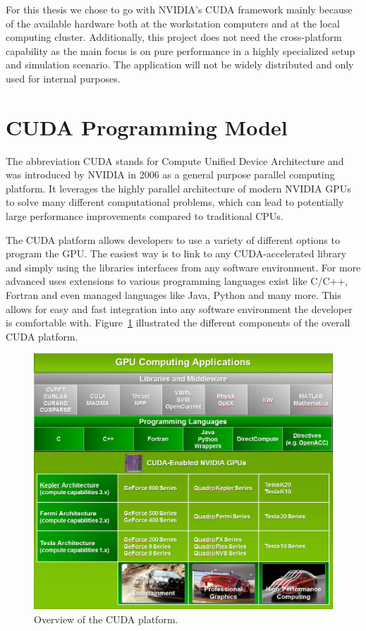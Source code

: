 \documentclass[a4paper,11pt]{kth-mag}
\begin{document}
For this thesis we chose to go with NVIDIA's CUDA framework mainly because of the available hardware both at the workstation computers and at the local computing cluster. Additionally, this project does not need the cross-platform capability as the main focus is on pure performance in a highly specialized setup and simulation scenario. The application will not be widely distributed and only used for internal purposes.

\section{CUDA Programming Model}
\label{sec:CUDA}
The abbreviation CUDA stands for Compute Unified Device Architecture and was introduced by NVIDIA in 2006 as a general purpose parallel computing platform. It leverages the highly parallel architecture of modern NVIDIA GPUs to solve many different computational problems, which can lead to potentially large performance improvements compared to traditional CPUs.

The CUDA platform allows developers to use a variety of different options to program the GPU. The easiest way is to link to any CUDA-accelerated library and simply using the libraries interfaces from any software environment. For more advanced uses extensions to various programming languages exist like C/C++, Fortran and even managed languages like Java, Python and many more. This allows for easy and fast integration into any software environment the developer is comfortable with. Figure~\ref{fig:cuda_overview} illustrated the different components of the overall CUDA platform.

\begin{figure}[!htbp]
  \centering
  \includegraphics[width=.9\textwidth]{img/cuda_overview.png}
  \caption{Overview of the CUDA platform.}
  \label{fig:cuda_overview}
\end{figure}
\end{document}
